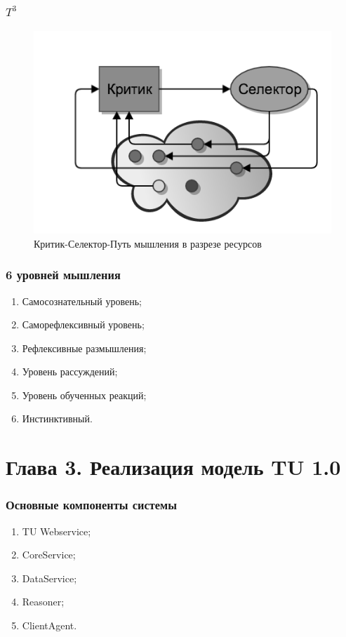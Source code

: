 \documentclass[14pt]{beamer}
\begin{document}
\begin{frame}
\frametitle{$T^3$}
\begin{figure} [h] 
  \center
  \includegraphics [scale=0.6] {CSW_EX}
  \caption{Критик-Селектор-Путь мышления в разрезе ресурсов} 
  \label{img:csw_ex} 
\end{figure}
\end{frame}

\begin{frame}
\frametitle{6 уровней мышления}
\begin{enumerate}
	\item Самосознательный уровень;
	\item Саморефлексивный уровень;
	\item Рефлексивные размышления;
	\item Уровень рассуждений;
	\item Уровень обученных реакций;
	\item Инстинктивный.
\end{enumerate}
\end{frame}


%
%
\section[Глава 3]{Глава 3. Реализация модель TU 1.0}



\begin{frame}
\frametitle{Основные компоненты системы}
\begin{enumerate}
	\item TU Webservice;
	\item CoreService;
	\item DataService;
	\item Reasoner;
	\item ClientAgent.
\end{enumerate}
\end{frame}
\end{document}
